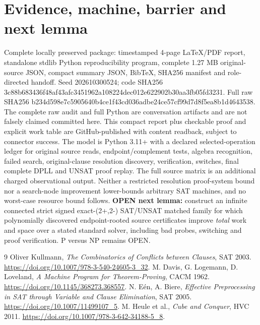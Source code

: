 \documentclass[11pt]{article}
\begin{document}
\section{Evidence, machine, barrier and next lemma}
Complete locally preserved package: timestamped 4-page LaTeX/PDF report, standalone stdlib Python reproducibility program, complete 1.27 MB original-source JSON, compact summary JSON, BibTeX, SHA256 manifest and role-directed handoff. Seed 202610300524; code SHA256 3c88b683436f48af43afc3451962a108224dec012e622902b30aa3fb05fd3231. Full raw SHA256 b234d598e7c5905640b4ce1f43cd036adbe24ce57cf99d7d8f5ea8b1d4643538. The complete raw audit and full Python are conversation artifacts and are not falsely claimed committed here. This compact report plus checkable proof and explicit work table are GitHub-published with content readback, subject to connector success.
The model is Python 3.11+ with a declared selected-operation ledger for original source reads, endpoint/complement tests, algebra recognition, failed search, original-clause resolution discovery, verification, switches, final complete DPLL and UNSAT proof replay. The full source matrix is an additional charged observational output. Neither a restricted resolution proof-system bound nor a search-node improvement lower-bounds arbitrary SAT machines, and no worst-case resource bound follows.
\textbf{OPEN next lemma:} construct an infinite connected strict signed exact-(2+,2-) SAT/UNSAT matched family for which polynomially discovered endpoint-rooted source certificates improve \emph{total} work and space over a stated standard solver, including bad probes, switching and proof verification. P versus NP remains OPEN.
\begin{thebibliography}{9}
 Oliver Kullmann, \emph{The Combinatorics of Conflicts between Clauses}, SAT 2003. \url{https://doi.org/10.1007/978-3-540-24605-3_32}.
 M. Davis, G. Logemann, D. Loveland, \emph{A Machine Program for Theorem-Proving}, CACM 1962. \url{https://doi.org/10.1145/368273.368557}.
 N. E\'en, A. Biere, \emph{Effective Preprocessing in SAT through Variable and Clause Elimination}, SAT 2005. \url{https://doi.org/10.1007/11499107_5}.
 M. Heule et al., \emph{Cube and Conquer}, HVC 2011. \url{https://doi.org/10.1007/978-3-642-34188-5_8}.
\end{thebibliography}
\end{document}
